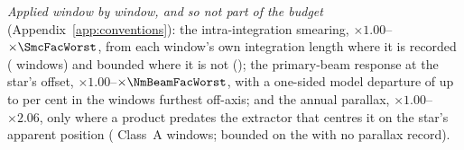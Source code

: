 \par\smallskip\raggedright\emph{Applied window by window, and so not part of the budget} (Appendix~\ref{app:conventions}): the intra-integration smearing, $\times1.00$--$\times\SmcFacWorst$, from each window's own integration length where it is recorded (\SmcNMeas{} windows) and bounded where it is not (\SmcNBound); the primary-beam response at the star's offset, $\times1.00$--$\times\NmBeamFacWorst$, with a one-sided model departure of up to \BmModelMaxPct{} per cent in the \BmNAboveTenPct{} windows furthest off-axis; and the annual parallax, $\times1.00$--$\times2.06$, only where a product predates the extractor that centres it on the star's apparent position (\PxaNWinARet{} Class~A windows; bounded on the \PxaNMissing{} with no parallax record).

